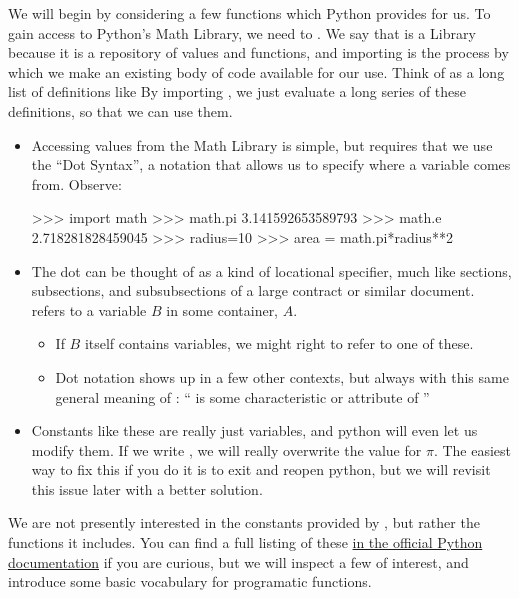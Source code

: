 
We will begin by considering a few functions which Python provides for us.
To gain access to Python's Math Library, we need to .
We say that  is a Library because it is a repository of values and functions, and importing is the process by which we make an existing body of code available for our use.
Think of  as a long list of definitions like 
By importing , we just evaluate a long series of these definitions, so that we can use them.

\begin{itemize}
    \item Accessing values from the Math Library is simple, but requires that we use the ``Dot Syntax'', a notation that allows us to specify where a variable comes from.
        Observe:
\begin{codeblock}
>>> import math
>>> math.pi
3.141592653589793
>>> math.e
2.718281828459045
>>> radius=10
>>> area = math.pi*radius**2
\end{codeblock}
    \item The dot can be thought of as a kind of locational specifier, much like sections, subsections, and subsubsections of a large contract or similar document.
         refers to a variable $B$ in some container, $A$.
        \begin{itemize}
            \item If $B$ itself contains variables, we might right  to refer to one of these.
            \item Dot notation shows up in a few other contexts, but always with this same general meaning of :
                `` is some characteristic or attribute of ''
        \end{itemize}
    \item Constants like these are really just variables, and python will even let us modify them.
        If we write , we will really overwrite the value for $\pi$.
        The easiest way to fix this if you do it is to exit and reopen python, but we will revisit this issue later with a better solution.
\end{itemize}

We are not presently interested in the constants provided by , but rather the functions it includes.
You can find a full listing of these \href{http://docs.python.org/2/library/math.html}{in the official Python documentation} if you are curious, but we will inspect a few of interest, and introduce some basic vocabulary for programatic functions.

